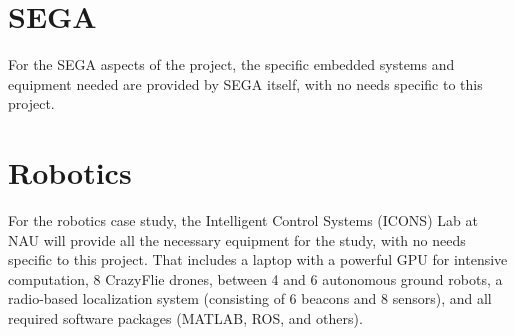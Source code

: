 \documentclass{article}
\begin{document}
\section*{SEGA}

For the SEGA aspects of the project, the specific embedded systems and equipment needed are provided by SEGA itself, with no needs specific to this project.


\section*{Robotics}

For the robotics case study, the Intelligent Control Systems (ICONS) Lab at NAU will provide all the necessary equipment for the study, with no needs specific to this project.
That includes a laptop with a powerful GPU for intensive computation, 8 CrazyFlie drones, between 4 and 6 autonomous ground robots, a radio-based localization system (consisting of 6 beacons and 8 sensors), and all required software packages (MATLAB, ROS, and others).
\end{document}
